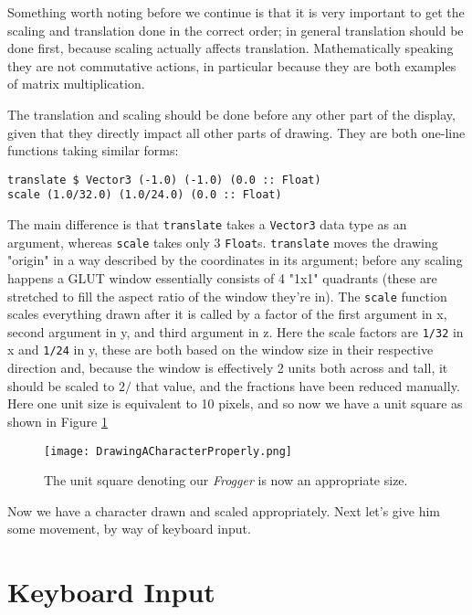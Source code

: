 \documentclass[12pt, a4paper]{report}
\begin{document}
\par

Something worth noting before we continue is that it is very important to get the scaling and translation done in the correct order; in general translation should be done first, because scaling actually affects translation.
Mathematically speaking they are not commutative actions, in particular because they are both examples of matrix multiplication.

\par

The translation and scaling should be done before any other part of the display, given that they directly impact all other parts of drawing.
They are both one-line functions taking similar forms:

\begin{lstlisting}
translate $ Vector3 (-1.0) (-1.0) (0.0 :: Float)
scale (1.0/32.0) (1.0/24.0) (0.0 :: Float)
\end{lstlisting}

The main difference is that \verb|translate| takes a \verb|Vector3| data type as an argument, whereas \verb|scale| takes only 3 \verb|Float|s.
\verb|translate| moves the drawing "origin" in a way described by the coordinates in its argument; before any scaling happens a GLUT window essentially consists of 4 "1x1" quadrants (these are stretched to fill the aspect ratio of the window they're in).
The \verb|scale| function scales everything drawn after it is called by a factor of the first argument in x, second argument in y, and third argument in z.
Here the scale factors are \verb|1/32| in x and \verb|1/24| in y, these are both based on the window size in their respective direction and, because the window is effectively 2 units both across and tall, it should be scaled to $2/$ that value, and the fractions have been reduced manually.
Here one unit size is equivalent to 10 pixels, and so now we have a unit square as shown in Figure \ref{fig:drawingacharacterproperly}

\begin{figure}[ht]
  \centering
  \caption{The unit square denoting our \textit{Frogger} is now an appropriate size.}
  \texttt{[image: DrawingACharacterProperly.png]}
  \label{fig:drawingacharacterproperly}
\end{figure}

Now we have a character drawn and scaled appropriately.
Next let's give him some movement, by way of keyboard input.

\section{Keyboard Input}
\end{document}
